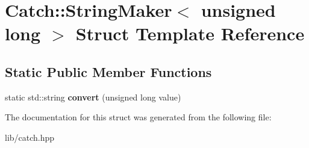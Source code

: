 \hypertarget{struct_catch_1_1_string_maker_3_01unsigned_01long_01_4}{}\section{Catch\+:\+:String\+Maker$<$ unsigned long $>$ Struct Template Reference}
\label{struct_catch_1_1_string_maker_3_01unsigned_01long_01_4}
\subsection*{Static Public Member Functions}
\begin{DoxyCompactItemize}
\item 
\mbox{\label{struct_catch_1_1_string_maker_3_01unsigned_01long_01_4_ae105dc97e4462a86a61b59667f8423c9}} 
static std\+::string {\bfseries convert} (unsigned long value)
\end{DoxyCompactItemize}


The documentation for this struct was generated from the following file\+:\begin{DoxyCompactItemize}
\item 
lib/catch.\+hpp\end{DoxyCompactItemize}
